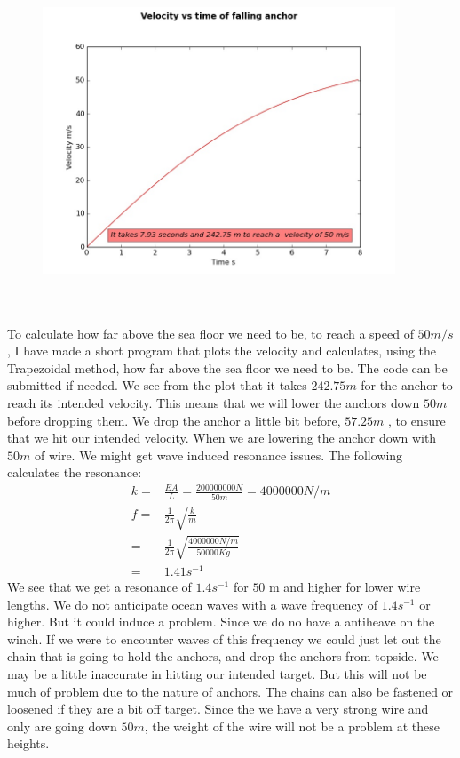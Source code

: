 \documentclass[DIV=calc, paper=a4, fontsize=13pt, twocolumn]{scrartcl}	 %
\begin{document}
\begin{figure}[t]
\includegraphics[width=10.5cm,height=10cm]{velocity_plot.jpg}
\end{figure}
To calculate how far above the sea floor we need to be, to reach a speed of $50 m/s $, I have made a short program that plots the velocity and calculates, using the Trapezoidal method, how far above the sea floor we need to be. The code can be submitted if needed.
\newline
We see from the plot that it takes $242.75 m$ for the anchor to reach its intended velocity. This means that we will lower the anchors down $50 m$ before dropping them. We drop the anchor a little bit before, $57.25 m$ , to ensure that we hit our intended velocity.
\newline
When we are lowering the anchor down with $50 m$ of wire. We might get wave induced resonance issues. The following calculates the resonance:
\begin{align}
k =& \frac{EA}{L} = \frac{200 000 000 N}{50 m} = 4 000 000 N/m \\
f =& \frac{1}{2\pi}\sqrt{\frac{k}{m}} \\
  =& \frac{1}{2\pi}\sqrt{\frac{4 000 000 N/m}{50 000 Kg }} \\
  =& 1.41 s^{-1}
\end{align}
We see that we get a resonance of $1.4 s^{-1}$ for $50$ m and higher for lower wire lengths. We do not anticipate ocean waves with a wave frequency of $1.4 s^{-1}$ or higher. But it could induce a problem. Since we do no have a antiheave on the winch.
\newline
If we were to encounter waves of this frequency we could just let out the chain that is going to hold the anchors, and drop the anchors from topside.  We may be a little inaccurate in hitting our intended target. But this will not be much of problem due to the nature of anchors. The chains can also be fastened or loosened if they are a bit off target.
\newline
Since the we have a very strong wire and only are going down $50 m$, the weight of the wire will not be a problem at these heights.
\end{document}
